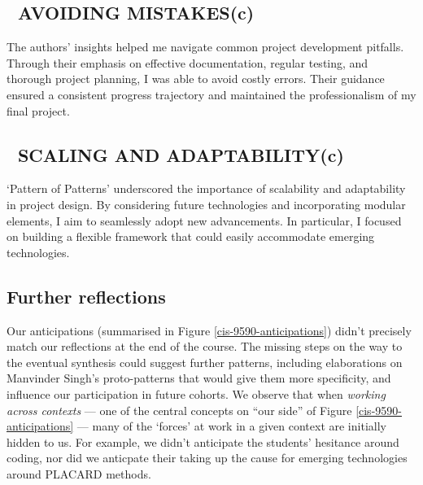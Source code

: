 \documentclass[acmlarge,timestamp]{acmart}
\newcommand{\cognitive}{(c)}
\begin{document}
\subsection*{💎 AVOIDING MISTAKES{\hfill \cognitive}}
The authors' insights helped me navigate common project development
pitfalls.  Through their emphasis on effective documentation, regular
testing, and thorough project planning, I was able to avoid costly
errors.  Their guidance ensured a consistent progress trajectory and
maintained the professionalism of my final project.

\subsection*{💎 SCALING AND ADAPTABILITY{\hfill \cognitive}}
‘Pattern of Patterns’ underscored the importance of scalability and
adaptability in project design.  By considering future technologies
and incorporating modular elements, I aim to seamlessly adopt new
advancements.  In particular, I focused on building a flexible
framework that could easily accommodate emerging technologies.

\subsection{Further reflections}

Our anticipations (summarised in Figure \ref{cis-9590-anticipations})
didn’t precisely match our reflections at the end of the course.  The
missing steps on the way to the eventual synthesis could suggest
further patterns, including elaborations on Manvinder Singh’s
proto-patterns that would give them more specificity, and influence
our participation in future cohorts.  We observe that when
\emph{working across contexts} — one of the central concepts on “our
side” of Figure \ref{cis-9590-anticipations} — many of the ‘forces’ at
work in a given context are initially hidden to us.  For example, we
didn’t anticipate the students’ hesitance around coding, nor did we
anticpate their taking up the cause for emerging technologies around
PLACARD methods.

\end{document}
